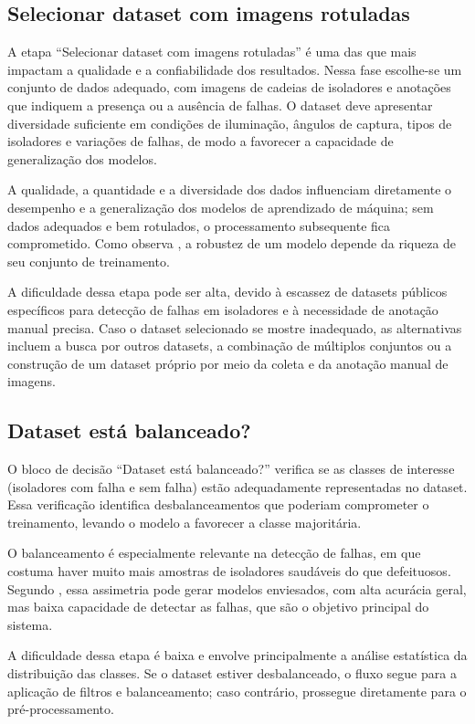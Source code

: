 \subsection{Selecionar dataset com imagens rotuladas}
A etapa ``Selecionar dataset com imagens rotuladas'' é uma das que mais impactam a qualidade e a confiabilidade dos resultados. Nessa fase escolhe-se um conjunto de dados adequado, com imagens de cadeias de isoladores e anotações que indiquem a presença ou a ausência de falhas. O dataset deve apresentar diversidade suficiente em condições de iluminação, ângulos de captura, tipos de isoladores e variações de falhas, de modo a favorecer a capacidade de generalização dos modelos.

A qualidade, a quantidade e a diversidade dos dados influenciam diretamente o desempenho e a generalização dos modelos de aprendizado de máquina; sem dados adequados e bem rotulados, o processamento subsequente fica comprometido. Como observa , a robustez de um modelo depende da riqueza de seu conjunto de treinamento.

A dificuldade dessa etapa pode ser alta, devido à escassez de datasets públicos específicos para detecção de falhas em isoladores e à necessidade de anotação manual precisa. Caso o dataset selecionado se mostre inadequado, as alternativas incluem a busca por outros datasets, a combinação de múltiplos conjuntos ou a construção de um dataset próprio por meio da coleta e da anotação manual de imagens.

\subsection{Dataset está balanceado?}
O bloco de decisão ``Dataset está balanceado?'' verifica se as classes de interesse (isoladores com falha e sem falha) estão adequadamente representadas no dataset. Essa verificação identifica desbalanceamentos que poderiam comprometer o treinamento, levando o modelo a favorecer a classe majoritária.

O balanceamento é especialmente relevante na detecção de falhas, em que costuma haver muito mais amostras de isoladores saudáveis do que defeituosos. Segundo , essa assimetria pode gerar modelos enviesados, com alta acurácia geral, mas baixa capacidade de detectar as falhas, que são o objetivo principal do sistema.

A dificuldade dessa etapa é baixa e envolve principalmente a análise estatística da distribuição das classes. Se o dataset estiver desbalanceado, o fluxo segue para a aplicação de filtros e balanceamento; caso contrário, prossegue diretamente para o pré-processamento.

